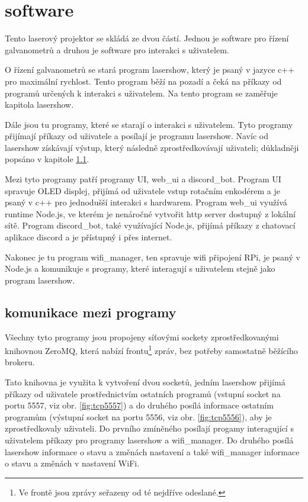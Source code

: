 \chapter{software}
Tento laserový projektor se skládá ze dvou částí. Jednou je software pro řízení galvanometrů a druhou je software pro interakci s uživatelem.

O řízení galvanometrů se stará program lasershow, který je psaný v jazyce c++ pro maximální rychlost. Tento program běží na pozadí a čeká na příkazy od programů určených k interakci s uživatelem. Na tento program se zaměřuje kapitola lasershow. 

Dále jsou tu programy, které se starají o interakci s uživatelem. Tyto programy přijímají příkazy od uživatele a posílají je programu lasershow. Navíc od lasershow získávají výstup, který následně zprostředkovávají uživateli; důkladněji popsáno v kapitole \ref{sec:comms}.

Mezi tyto programy patří programy UI, web\_ui a discord\_bot. Program UI spravuje OLED displej, přijímá od uživatele vstup rotačním enkodérem a je psaný v c++ pro jednodušší interakci s hardwarem. Program web\_ui využívá runtime Node.js, ve kterém je nenáročné vytvořit http server dostupný z lokální sítě.  Program discord\_bot, také využívající Node.js, přijímá příkazy z chatovací aplikace discord a je přístupný i přes internet.

Nakonec je tu program wifi\_manager, ten spravuje wifi připojení RPi, je psaný v Node.js a komunikuje s programy, které interagují s uživatelem stejně jako program lasershow.

\section{komunikace mezi programy} \label{sec:comms}
Všechny tyto programy jsou propojeny síťovými sockety zprostředkovanými knihovnou ZeroMQ, která nabízí frontu\footnote{Ve frontě jsou zprávy seřazeny od té nejdříve odeslané.} zpráv, bez potřeby samostatně běžícího brokeru.

Tato knihovna je využita k vytvoření dvou socketů, jedním lasershow přijímá příkazy od uživatele prostřednictvím ostatních programů (vstupní socket na portu 5557, viz obr. \ref{fig:tcp5557}) a do druhého posílá informace ostatním programům (výstupní socket na portu 5556, viz obr. \ref{fig:tcp5556}), aby je zprostředkovaly uživateli. Do prvního zmíněného posílají progamy interagující s uživatelem příkazy pro programy lasershow a wifi\_manager. Do druhého posílá lasershow informace o stavu a změnách nastavení  a také wifi\_manager informace o stavu a změnách v nastavení WiFi.

